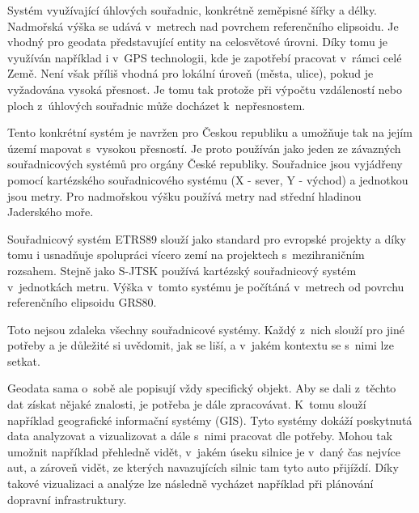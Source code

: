 

Systém využívající úhlových souřadnic, konkrétně zeměpisné šířky a délky. Nadmořská výška se udává v~metrech nad povrchem referenčního elipsoidu.
Je vhodný pro geodata představující entity na celosvětové úrovni. Díky tomu je využíván například i v~GPS technologii, kde je zapotřebí pracovat v~rámci celé Země.
Není však příliš vhodná pro lokální úroveň (města, ulice), pokud je vyžadována vysoká přesnost. Je tomu tak protože při výpočtu vzdáleností nebo ploch z~úhlových souřadnic může docházet k~nepřesnostem.



Tento konkrétní systém je navržen pro Českou republiku a umožňuje tak na jejím území mapovat s~vysokou přesností. Je proto používán jako jeden ze závazných souřadnicových systémů pro orgány České republiky.
Souřadnice jsou vyjádřeny pomocí kartézského souřadnicového systému (X - sever, Y - východ) a jednotkou jsou metry. Pro nadmořskou výšku používá metry nad střední hladinou Jaderského moře.


Souřadnicový systém ETRS89 slouží jako standard pro evropské projekty a díky tomu i usnadňuje spolupráci vícero zemí na projektech s~mezihraničním rozsahem.
Stejně jako S-JTSK používá kartézský souřadnicový systém v~jednotkách metru. Výška v~tomto systému je počítáná v~metrech od povrchu referenčního elipsoidu GRS80.

Toto nejsou zdaleka všechny souřadnicové systémy. Každý z~nich slouží pro jiné potřeby a je důležité si uvědomit, jak se liší, a v~jakém kontextu se s~nimi lze setkat.



Geodata sama o~sobě ale popisují vždy specifický objekt. Aby se dali z~těchto dat získat nějaké znalosti, je potřeba je dále zpracovávat. K~tomu slouží například geografické informační systémy (GIS). Tyto systémy dokáží poskytnutá data analyzovat a vizualizovat a dále s~nimi pracovat dle potřeby. Mohou tak umožnit například přehledně vidět, v~jakém úseku silnice je v~daný čas nejvíce aut, a zároveň vidět, ze kterých navazujících silnic tam tyto auto přijíždí. Díky takové vizualizaci a analýze lze následně vycházet například při plánování dopravní infrastruktury.

